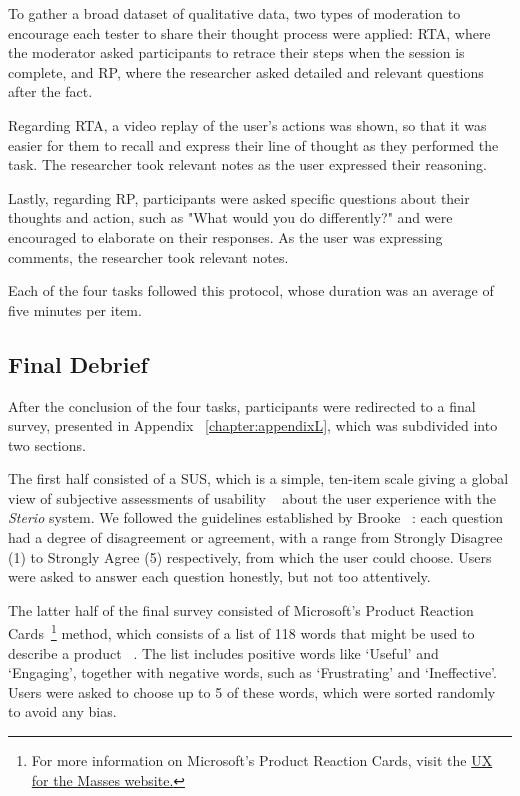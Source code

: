 To gather a broad dataset of qualitative data, two types of moderation to encourage each tester to share their thought process were applied: \ac{RTA}, where the moderator asked participants to retrace their steps when the session is complete, and \ac{RP}, where the researcher asked detailed and relevant questions after the fact. ~\cite{Experience2011}

Regarding \ac{RTA}, a video replay of the user's actions was shown, so that it was easier for them to recall and express their line of thought as they performed the task. The researcher took relevant notes as the user expressed their reasoning.

Lastly, regarding \ac{RP}, participants were asked specific questions about their thoughts and action, such as "What would you do differently?" and were encouraged to elaborate on their responses. As the user was expressing comments, the researcher took relevant notes.

Each of the four tasks followed this protocol, whose duration was an average of five minutes per item. 

\subsection{Final Debrief}
\label{sub:final}

After the conclusion of the four tasks, participants were redirected to a final survey, presented in Appendix ~\ref{chapter:appendixL}, which was subdivided into two sections. 

The first half consisted of a \ac{SUS}, which is a simple, ten-item scale giving a global view of subjective assessments of usability ~\cite{Kusic2018} about the user experience with the \textit{Sterio} system. We followed the guidelines established by Brooke ~\cite{Kusic2018}: each question had a degree of disagreement or agreement, with a range from Strongly Disagree (1) to Strongly Agree (5) respectively, from which the user could choose. Users were asked to answer each question honestly, but not too attentively.

The latter half of the final survey consisted of Microsoft's Product Reaction Cards~\footnote{For more information on Microsoft's Product Reaction Cards, visit the \href{http://www.uxforthemasses.com/product-reaction-cards/}{UX for the Masses website.}} method, which consists of a list of 118 words that might be used to describe a product ~\cite{Experience2011}. The list includes positive words like ‘Useful’ and ‘Engaging’, together with negative words, such as ‘Frustrating’ and ‘Ineffective’. Users were asked to choose up to 5 of these words, which were sorted randomly to avoid any bias.

